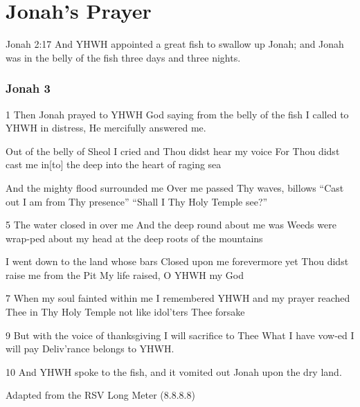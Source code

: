 \documentclass{article}
\begin{document}
\section*{Jonah's Prayer}

Jonah 2:17 And YHWH appointed a great fish to swallow up Jonah; and Jonah was in the belly of the fish three days and three nights.

\subsubsection*{Jonah 3}

1 Then Jonah prayed to YHWH God\newline
saying from the belly of the fish I called to YHWH in distress,\newline
He mercifully answered me.\newline

Out of the belly of Sheol\newline
I cried and Thou didst hear my voice For Thou didst cast me in[to] the deep\newline
into the heart of raging sea\newline

And the mighty flood surrounded me\newline
Over me passed Thy waves, billows  ``Cast out I am from Thy presence''\newline
``Shall I Thy Holy Temple see?''\newline

5 The water closed in over me\newline
And the deep round about me was\newline
Weeds were wrap-ped about my head at the deep roots of the mountains\newline

I went down to the land whose bars\newline
Closed upon me forevermore\newline
yet Thou didst raise me from the Pit\newline
My life raised, O YHWH my God\newline

7 When my soul fainted within me\newline
I remembered YHWH and my prayer\newline
reached Thee in Thy Holy Temple not like idol'ters Thee forsake\newline

9 But with the voice of thanksgiving\newline
I will sacrifice to Thee\newline
What I have vow-ed I will pay\newline
Deliv'rance belongs to YHWH.\newline

10 And YHWH spoke to the fish, and it vomited out Jonah upon the dry land.


Adapted from the RSV 
Long Meter (8.8.8.8)
\end{document}
